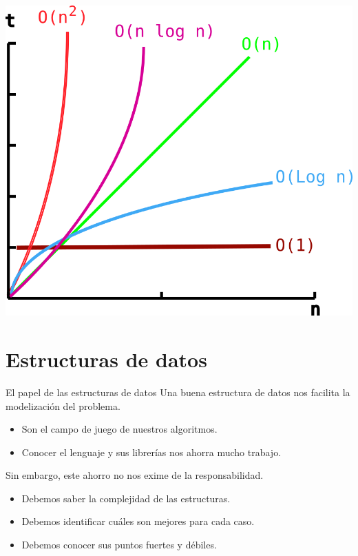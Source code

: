 \documentclass[10pt]{beamer}
\begin{document}
\begin{frame}[plain]{}
  \centering \includegraphics[height=0.8\paperheight]{growth.png}
\end{frame}


\section{Estructuras de datos}

\begin{frame}{El papel de las estructuras de datos}
  Una buena estructura de datos nos facilita la modelización del problema.
  \begin{itemize}
  \item Son el campo de juego de nuestros algoritmos.
  \item Conocer el lenguaje y sus librerías nos ahorra mucho trabajo.
  \end{itemize}
  Sin embargo, este ahorro no nos exime de la responsabilidad.
  \begin{itemize}
  \item Debemos saber la complejidad de las estructuras.
  \item Debemos identificar cuáles son mejores para cada caso.
  \item Debemos conocer sus puntos fuertes y débiles.
  \end{itemize}
\end{frame}
\end{document}
